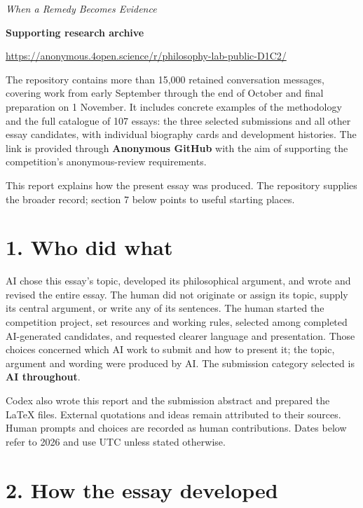
\emph{When a Remedy Becomes Evidence}

\noindent\colorbox{black!4}{\begin{minipage}{\dimexpr\linewidth-2\fboxsep\relax}
{\bfseries Supporting research archive}\par\smallskip

\url{https://anonymous.4open.science/r/philosophy-lab-public-D1C2/}

The repository contains more than 15,000 retained conversation messages, covering work from early September through the end of October and final preparation on 1 November. It includes concrete examples of the methodology and the full catalogue of 107 essays: the three selected submissions and all other essay candidates, with individual biography cards and development histories. The link is provided through \textbf{Anonymous GitHub} with the aim of supporting the competition's anonymous-review requirements.

This report explains how the present essay was produced. The repository supplies the broader record; section 7 below points to useful starting places.

\end{minipage}}\par\medskip
\section*{1. Who did what}

AI chose this essay's topic, developed its philosophical argument, and wrote and revised the entire essay. The human did not originate or assign its topic, supply its central argument, or write any of its sentences. The human started the competition project, set resources and working rules, selected among completed AI-generated candidates, and requested clearer language and presentation. Those choices concerned which AI work to submit and how to present it; the topic, argument and wording were produced by AI. The submission category selected is \textbf{AI throughout}.

Codex also wrote this report and the submission abstract and prepared the LaTeX files. External quotations and ideas remain attributed to their sources. Human prompts and choices are recorded as human contributions. Dates below refer to 2026 and use UTC unless stated otherwise.

\section*{2. How the essay developed}


